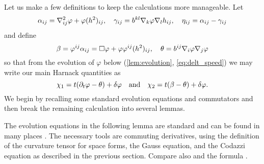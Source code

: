 \documentclass{amsart}
\begin{document}
Let us make a few definitions to keep the calculations more manageable. Let
\[
\alpha_{ij} = \nabla^2_{ij} \varphi + \varphi(h^2)_{ij}, \quad \gamma_{ij} = b^{kl} \nabla_k \varphi \nabla_l h_{ij}, \quad \eta_{ij} = \alpha_{ij} - \gamma_{ij}
\]
and define
\[
\beta = \varphi^{ij} \alpha_{ij} = \Box\varphi + \varphi \varphi^{ij}(h^2)_{ij}, \quad \theta =  b^{ij} \nabla_i \varphi \nabla_j \varphi
\]
so that from the evolution of \(\varphi\) below (\cref{lem:evolution}, \cref{eq:delt_speed}) we may write our main Harnack quantities as
\[
\chi_1 = t(\partial_t\varphi- \theta) + \delta\varphi
\quad \mbox{and}\quad
\chi_2 = t(\beta - \theta) + \delta\varphi.
\]
We begin by recalling some standard evolution equations and commutators and then break the remaining calculation into several lemmas.

The evolution equations in the following lemma are standard and can be found in many places \cite{MR1296393, MR1100812, MR1316556, MR892052, MR1480081}. The necessary tools are commuting derivatives, using the definition of the curvature tensor for space forms, the Gauss equation, and the Codazzi equation as described in the previous section. Compare also \cite[p.~94-95]{Gerhardt:/2006} and the formula \cite[eq.~(6.17)]{Gerhardt:01/1996}.
\end{document}
